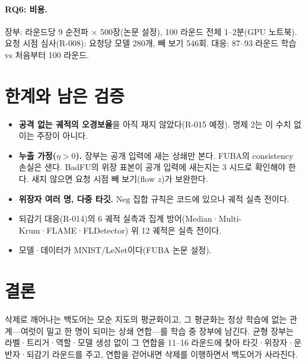 \documentclass[10pt,a4paper]{article}
\begin{document}
\paragraph{RQ6: 비용.} 장부: 라운드당 9 순전파 $\times$ 500장(논문 설정), 100 라운드 전체 1--2분(GPU 노트북). 요청 시점 심사(R-008): 요청당 모델 280개, 빼 보기 546회. 대응: 87--93 라운드 학습 vs 처음부터 100 라운드.

\section{한계와 남은 검증}
\begin{itemize}
\item \textbf{공격 없는 궤적의 오경보율}을 아직 재지 않았다(R-015 예정). 명제 2는 이 수치 없이는 주장이 아니다.
\item \textbf{누출 가정($\eta>0$).} 장부는 공개 입력에 새는 상쇄만 본다. FUBA의 consistency 손실은 샌다. BadFU의 위장 표본이 공개 입력에 새는지는 3 시드로 확인해야 한다. 새지 않으면 요청 시점 빼 보기(flow $z$)가 보완한다.
\item \textbf{위장자 여러 명, 다중 타깃.} $\mathrm{Neg}$ 집합 규칙은 코드에 있으나 궤적 실측 전이다.
\item 되감기 대응(R-014)의 6 궤적 실측과 집계 방어(Median·Multi-Krum·FLAME·FLDetector) 위 12 궤적은 실측 전이다.
\item 모델·데이터가 MNIST/LeNet이다(FUBA 논문 설정).
\end{itemize}

\section{결론}
삭제로 깨어나는 백도어는 모순 지도의 평균화이고, 그 평균화는 정상 학습에 없는 관계---여럿이 밀고 한 명이 되미는 상쇄 연합---를 학습 중 장부에 남긴다. 균형 장부는 라벨·트리거·역할·모델 생성 없이 그 연합을 11--16 라운드에 찾아 타깃·위장자·운반자·되감기 라운드를 주고, 연합을 걷어내면 삭제를 이행하면서 백도어가 사라진다.
\end{document}
